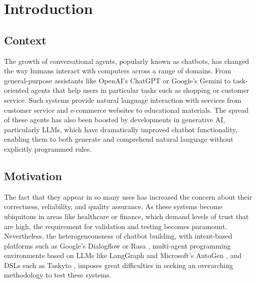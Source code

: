 
\chapter{Introduction}\label{chapter:introduction}

\section{Context}

The growth of conversational agents, popularly known as chatbots,
has changed the way humans interact with computers across a range of domains.
From general-purpose assistants like OpenAI's ChatGPT \autocite{ChatGPT} or Google's Gemini \autocite{GoogleGemini} to task-oriented agents that help users in particular tasks such as shopping or customer service.
Such systems provide natural language interaction with services from customer service and e-commerce websites to educational materials.
The spread of these agents has also been boosted by developments in generative \ac{AI}, particularly \acp{LLM}, which have dramatically improved chatbot functionality, enabling them to both generate and comprehend natural language without explicitly programmed rules.

\section{Motivation}

The fact that they appear in so many uses has increased the concern about their correctness, reliability, and quality assurance.
As these systems become ubiquitous in areas like healthcare or finance, which demand levels of trust that are high, the requirement for validation and testing becomes paramount.
Nevertheless, the heterogeneousness of chatbot building, with intent-based platforms such as Google's Dialogflow \autocite{Dialogflow} or Rasa \autocite{Rasa2020}, multi-agent programming environments based on \acp{LLM} like LangGraph \autocite{LangGraph} and Microsoft's AutoGen \autocite{AutoGen}, and \acp{DSL} such as Taskyto \autocite{sanchezcuadradoAutomatingDevelopmentTaskoriented2024}, imposes great difficulties in seeking an overarching methodology to test these systems.


